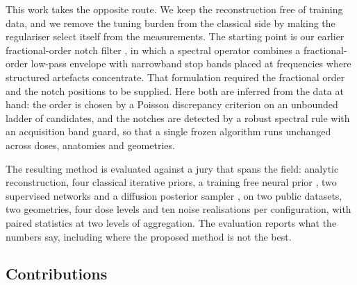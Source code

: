 This work takes the opposite route. We keep the reconstruction free of
training data, and we remove the tuning burden from the classical side by
making the regulariser select itself from the measurements. The starting
point is our earlier fractional-order notch filter \cite{singh2026spl}, in
which a spectral operator combines a fractional-order low-pass envelope with
narrowband stop bands placed at frequencies where structured artefacts
concentrate. That formulation required the fractional order and the notch
positions to be supplied. Here both are inferred from the data at hand: the
order is chosen by a Poisson discrepancy criterion on an unbounded ladder of
candidates, and the notches are detected by a robust spectral rule with an
acquisition band guard, so that a single frozen algorithm runs unchanged
across doses, anatomies and geometries.

The resulting method is evaluated against a jury that spans the field:
analytic reconstruction, four classical iterative priors, a training free
neural prior \cite{ulyanov2018dip,baguer2020dip}, two supervised networks
\cite{chen2017redcnn,adler2018lpd} and a diffusion posterior sampler
\cite{chung2023dps}, on two public datasets, two geometries, four dose levels
and ten noise realisations per configuration, with paired statistics at two
levels of aggregation. The evaluation reports what the numbers say, including
where the proposed method is not the best.

\subsection*{Contributions}

